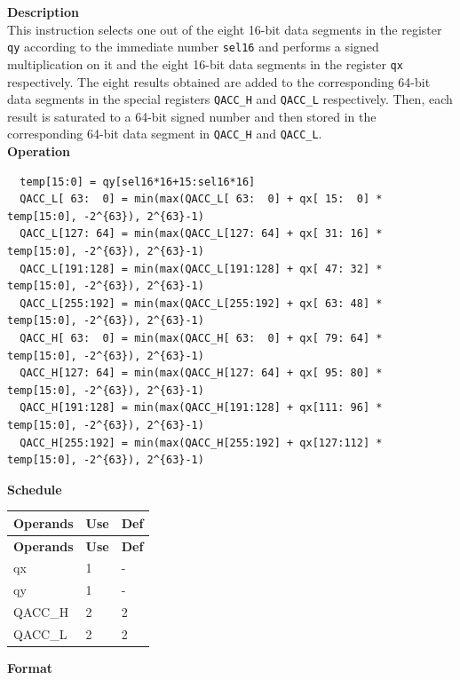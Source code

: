 \textbf{Description}\\
This instruction selects one out of the eight 16-bit data segments in the register \lstinline{qy} according to the immediate number \lstinline{sel16} and performs a signed multiplication on it and the eight 16-bit data segments in the register \lstinline{qx} respectively. The eight results obtained are added to the corresponding 64-bit data segments in the special registers \lstinline{QACC_H} and \lstinline{QACC_L} respectively. Then, each result is saturated to a 64-bit signed number and then stored in the corresponding 64-bit data segment in \lstinline{QACC_H} and \lstinline{QACC_L}.\\
\textbf{Operation}
\begin{lstlisting}
  temp[15:0] = qy[sel16*16+15:sel16*16]
  QACC_L[ 63:  0] = min(max(QACC_L[ 63:  0] + qx[ 15:  0] * temp[15:0], -2^{63}), 2^{63}-1)
  QACC_L[127: 64] = min(max(QACC_L[127: 64] + qx[ 31: 16] * temp[15:0], -2^{63}), 2^{63}-1)
  QACC_L[191:128] = min(max(QACC_L[191:128] + qx[ 47: 32] * temp[15:0], -2^{63}), 2^{63}-1)
  QACC_L[255:192] = min(max(QACC_L[255:192] + qx[ 63: 48] * temp[15:0], -2^{63}), 2^{63}-1)
  QACC_H[ 63:  0] = min(max(QACC_H[ 63:  0] + qx[ 79: 64] * temp[15:0], -2^{63}), 2^{63}-1)
  QACC_H[127: 64] = min(max(QACC_H[127: 64] + qx[ 95: 80] * temp[15:0], -2^{63}), 2^{63}-1)
  QACC_H[191:128] = min(max(QACC_H[191:128] + qx[111: 96] * temp[15:0], -2^{63}), 2^{63}-1)
  QACC_H[255:192] = min(max(QACC_H[255:192] + qx[127:112] * temp[15:0], -2^{63}), 2^{63}-1)
\end{lstlisting}

\textbf{Schedule}\\
\begin{longtable}[c]{|l|l|l|}
    \hline
    \rowcolor{lightgray}
    \textbf{Operands} & \textbf{Use} & \textbf{Def} \\\hline
    \endfirsthead
    \hline
    \rowcolor{lightgray}
     \textbf{Operands} & \textbf{Use} & \textbf{Def} \\\hline
    \endhead
    \hline
    \endfoot

     qx & 1 & - \\\hline
     qy & 1 & - \\\hline
     QACC\_H & 2 & 2 \\\hline
     QACC\_L & 2 & 2

\end{longtable}

\textbf{Format}\\

